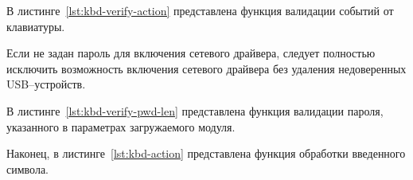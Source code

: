 В листинге~\ref{lst:kbd-verify-action} представлена функция валидации событий от клавиатуры.

Если не задан пароль для включения сетевого драйвера, следует полностью исключить возможность включения сетевого драйвера без удаления недоверенных USB--устройств. 

В листинге~\ref{lst:kbd-verify-pwd-len} представлена функция валидации пароля, указанного в параметрах загружаемого модуля.

Наконец, в листинге~\ref{lst:kbd-action} представлена функция обработки введенного символа.
